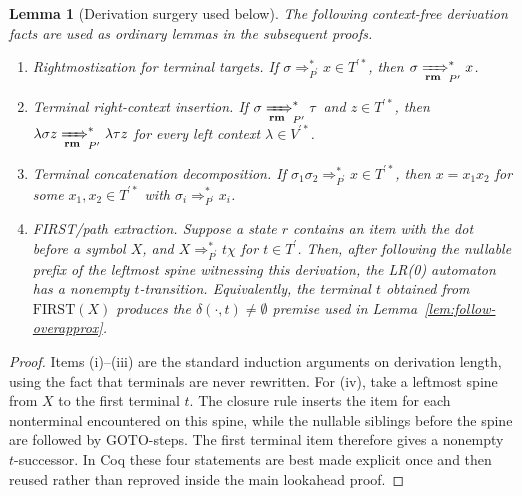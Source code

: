 \documentclass[11pt,a4paper]{article}
\theoremstyle{prettyplain}
\newtheorem{lemma}[theorem]{Lemma}
\theoremstyle{prettydef}
\newcommand{\RMP}{\xRightarrow[\mathbf{rm}]{}_{P^\prime}}
\begin{document}
\begin{lemma}[Derivation surgery used below]\label{lem:derivation-surgery}
The following context-free derivation facts are used as ordinary lemmas in the
subsequent proofs.
\begin{enumerate}[label=\textup{(\roman*)}]
\item \emph{Rightmostization for terminal targets.}  If
      \(\sigma\Rightarrow_{P^\prime}^*x\in T^{\prime *}\), then
      \(\sigma\RMP^*x\).
\item \emph{Terminal right-context insertion.}  If \(\sigma\RMP^*\tau\) and
      \(z\in T^{\prime *}\), then \(\lambda\sigma z\RMP^*\lambda\tau z\) for
      every left context \(\lambda\in V^{\prime *}\).
\item \emph{Terminal concatenation decomposition.}  If
      \(\sigma_1\sigma_2\Rightarrow_{P^\prime}^*x\in T^{\prime *}\), then
      \(x=x_1x_2\) for some \(x_1,x_2\in T^{\prime *}\) with
      \(\sigma_i\Rightarrow_{P^\prime}^*x_i\).
\item \emph{FIRST/path extraction.}  Suppose a state \(r\) contains an item with
      the dot before a symbol \(X\), and \(X\Rightarrow_{P^\prime}^*t\chi\) for
      \(t\in T^\prime\).  Then, after following the nullable prefix of the
      leftmost spine witnessing this derivation, the LR(0) automaton has a
      nonempty \(t\)-transition.  Equivalently, the terminal \(t\) obtained from
      \(\mathrm{FIRST}(X)\) produces the \(\delta(\cdot,t)\ne\emptyset\) premise
      used in Lemma~\ref{lem:follow-overapprox}.
\end{enumerate}
\end{lemma}

\begin{proof}
Items (i)--(iii) are the standard induction arguments on derivation length,
using the fact that terminals are never rewritten.  For (iv), take a leftmost
spine from \(X\) to the first terminal \(t\).  The closure rule inserts the item
for each nonterminal encountered on this spine, while the nullable siblings
before the spine are followed by \(\mathrm{GOTO}\)-steps.  The first terminal item
therefore gives a nonempty \(t\)-successor.  In Coq these four statements are
best made explicit once and then reused rather than reproved inside the main
lookahead proof.
\end{proof}
\end{document}

